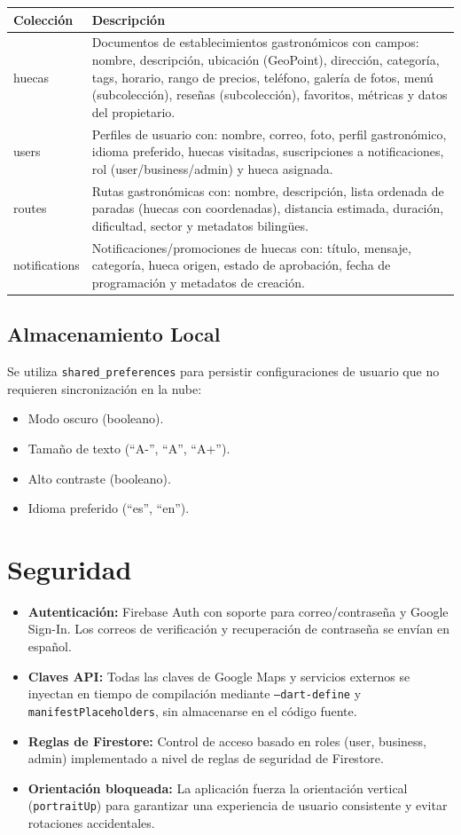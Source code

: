 \documentclass[11pt, a4paper, oneside]{report}
\begin{document}
\begin{longtable}{>{\ttfamily}p{3.5cm} p{9.5cm}}
\toprule
\textbf{Colección} & \textbf{Descripción} \\
\midrule
huecas & Documentos de establecimientos gastronómicos con campos: nombre, descripción, ubicación (GeoPoint), dirección, categoría, tags, horario, rango de precios, teléfono, galería de fotos, menú (subcolección), reseñas (subcolección), favoritos, métricas y datos del propietario. \\
users & Perfiles de usuario con: nombre, correo, foto, perfil gastronómico, idioma preferido, huecas visitadas, suscripciones a notificaciones, rol (user/business/admin) y hueca asignada. \\
routes & Rutas gastronómicas con: nombre, descripción, lista ordenada de paradas (huecas con coordenadas), distancia estimada, duración, dificultad, sector y metadatos bilingües. \\
notifications & Notificaciones/promociones de huecas con: título, mensaje, categoría, hueca origen, estado de aprobación, fecha de programación y metadatos de creación. \\
\bottomrule
\end{longtable}

\subsection{Almacenamiento Local}
Se utiliza \texttt{shared\_preferences} para persistir configuraciones de usuario que no requieren sincronización en la nube:
\begin{itemize}
  \item Modo oscuro (booleano).
  \item Tamaño de texto (``A-'', ``A'', ``A+'').
  \item Alto contraste (booleano).
  \item Idioma preferido (``es'', ``en'').
\end{itemize}

\section{Seguridad}

\begin{itemize}
  \item \textbf{Autenticación:} Firebase Auth con soporte para correo/contraseña y Google Sign-In. Los correos de verificación y recuperación de contraseña se envían en español.
  \item \textbf{Claves API:} Todas las claves de Google Maps y servicios externos se inyectan en tiempo de compilación mediante \texttt{--dart-define} y \texttt{manifestPlaceholders}, sin almacenarse en el código fuente.
  \item \textbf{Reglas de Firestore:} Control de acceso basado en roles (user, business, admin) implementado a nivel de reglas de seguridad de Firestore.
  \item \textbf{Orientación bloqueada:} La aplicación fuerza la orientación vertical (\texttt{portraitUp}) para garantizar una experiencia de usuario consistente y evitar rotaciones accidentales.
\end{itemize}
\end{document}
